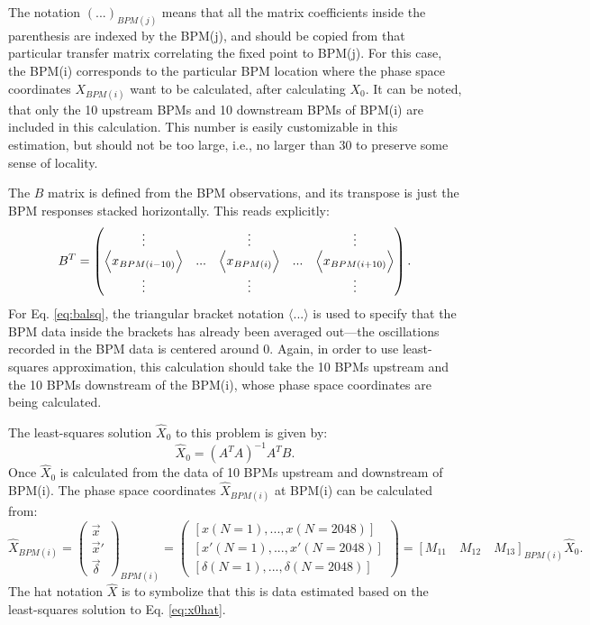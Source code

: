 The notation $(...)_{BPM(j)}$ means that all the matrix coefficients inside the parenthesis are indexed by the BPM(j), and should be copied from that particular transfer matrix correlating the fixed point to BPM(j). For this case, the BPM(i) corresponds to the particular BPM location where the phase space coordinates $X_{BPM(i)}$ want to be calculated, after calculating $X_0$. It can be noted, that only the 10 upstream BPMs and 10 downstream BPMs of BPM(i) are included in this calculation. This number is easily customizable in this estimation, but should not be too large, i.e., no larger than 30 to preserve some sense of locality. 

The $B$ matrix is defined from the BPM observations, and its transpose is just the BPM responses stacked horizontally. This reads explicitly:
\begin{equation}
    \label{eq:balsq}
    B^T =
    \begin{pmatrix}
    \vdots & & \vdots & & \vdots \\
    \Bigl< x_{BPM(i-10)} \Bigr> & ... &  \Bigl< x_{BPM(i)} \Bigr> &  ... & \Bigl< x_{BPM(i+10)} \Bigr> \\
    \vdots & & \vdots & & \vdots \\
    \end{pmatrix}. 
\end{equation}
For Eq. \ref{eq:balsq}, the triangular bracket notation $\langle ... \rangle$ is used to specify that the BPM data inside the brackets has already been averaged out---the oscillations recorded in the BPM data is centered around 0. Again, in order to use least-squares approximation, this calculation should take the 10 BPMs upstream and the 10 BPMs downstream of the BPM(i), whose phase space coordinates are being calculated. 

The least-squares solution $\hat{X}_0$ to this problem is given by:
\begin{equation}
    \label{eq:x0hat}
    \hat{X}_0 = (A^T A)^{-1} A^T B.
\end{equation}
Once $\hat{X}_0$ is calculated from the data of 10 BPMs upstream and downstream of BPM(i). The phase space coordinates $\hat{X}_{BPM(i)}$ at BPM(i) can be calculated from:
\begin{equation}
    \label{eq:xbpmi}
    \hat{X}_{BPM(i)} = \begin{pmatrix}
        \vec{x} \\
        \vec{x}' \\
        \vec{\delta}
    \end{pmatrix}_{BPM(i)}=
    \begin{pmatrix}
        \left[ x(N=1),...,x(N=2048) \right] \\
        \left[ x'(N=1),..., x'(N=2048) \right] \\
        \left[ \delta (N=1),..., \delta (N=2048) \right]
    \end{pmatrix}
    = \left[ M_{11} \quad M_{12} \quad M_{13} \right]_{BPM(i)} \hat{X}_0.  
\end{equation}
The hat notation $\hat{X}$ is to symbolize that this is data estimated based on the least-squares solution to Eq. \ref{eq:x0hat}. 

